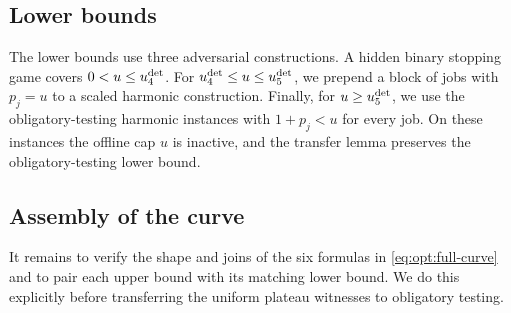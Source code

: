 \subsection{Lower bounds}
\label{sec:det-branchwise-lower}

The lower bounds use three adversarial constructions.  A hidden binary
stopping game covers $0<u\le u_{4}^{\mathrm{det}}$.  For
$u_{4}^{\mathrm{det}}\le u\le u_{5}^{\mathrm{det}}$, we prepend a block of jobs with $p_j=u$ to a
scaled harmonic construction.  Finally, for $u\ge u_{5}^{\mathrm{det}}$, we use the
obligatory-testing harmonic instances with $1+p_j<u$ for every job.  On
these instances the offline cap $u$ is inactive, and the transfer lemma
preserves the obligatory-testing lower bound.



\subsection{Assembly of the curve}
\label{sec:det-curve-assembly}

It remains to verify the shape and joins of the six formulas in
\cref{eq:opt:full-curve} and to
pair each upper bound with its matching lower bound.  We do this explicitly
before transferring the uniform plateau witnesses to obligatory testing.




